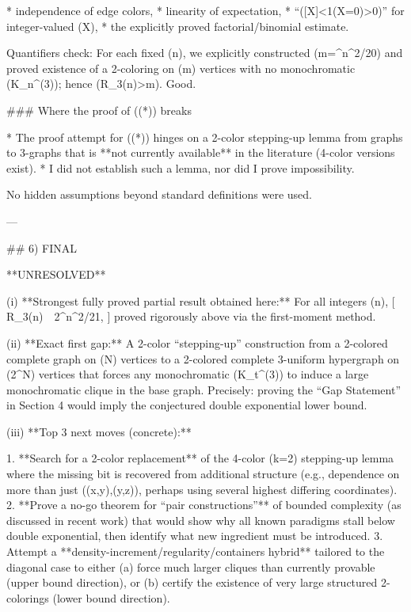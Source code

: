  * independence of edge colors,
  * linearity of expectation,
  * “([X]<1\Rightarrow \Pr(X=0)>0)” for integer-valued (X),
  * the explicitly proved factorial/binomial estimate.

Quantifiers check: For each fixed (n), we explicitly constructed (m=^{n^2/20}\rfloor) and proved existence of a 2-coloring on (m) vertices with no monochromatic (K_n^{(3)}); hence (R_3(n)>m). Good.

### Where the proof of ((*)) breaks

* The proof attempt for ((*)) hinges on a 2-color stepping-up lemma from graphs to 3-graphs that is **not currently available** in the literature (4-color versions exist). 
* I did not establish such a lemma, nor did I prove impossibility.

No hidden assumptions beyond standard definitions were used.

---

## 6) FINAL

**UNRESOLVED**

(i) **Strongest fully proved partial result obtained here:**
For all integers (n),
[
R_3(n)\ \ge\ 2^{n^2/21},
]
proved rigorously above via the first-moment method.

(ii) **Exact first gap:**
A 2-color “stepping-up” construction from a 2-colored complete graph on (N) vertices to a 2-colored complete 3-uniform hypergraph on (2^N) vertices that forces any monochromatic (K_t^{(3)}) to induce a large monochromatic clique in the base graph. Precisely: proving the “Gap Statement” in Section 4 would imply the conjectured double exponential lower bound.

(iii) **Top 3 next moves (concrete):**

1. **Search for a 2-color replacement** of the 4-color (k=2) stepping-up lemma where the missing bit is recovered from additional structure (e.g., dependence on more than just (\delta(x,y),\delta(y,z)), perhaps using several highest differing coordinates).
2. **Prove a no-go theorem for “pair constructions”** of bounded complexity (as discussed in recent work) that would show why all known paradigms stall below double exponential, then identify what new ingredient must be introduced. 
3. Attempt a **density-increment/regularity/containers hybrid** tailored to the diagonal case to either (a) force much larger cliques than currently provable (upper bound direction), or (b) certify the existence of very large structured 2-colorings (lower bound direction).

